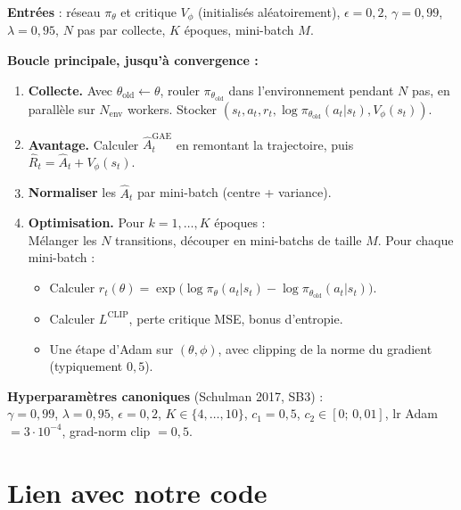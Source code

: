\documentclass[a4paper,11pt]{article}
\theoremstyle{clean}
\newcommand{\piT}{\pi_{\theta}}
\newcommand{\piOld}{\pi_{\theta_{\text{old}}}}
\begin{document}
\begin{tcolorbox}[colback=gray!5, colframe=black!50, boxrule=0.4pt, arc=1.5pt, left=8pt, right=8pt]
\textbf{Entrées} : réseau $\piT$ et critique $V_\phi$ (initialisés aléatoirement), $\epsilon=0{,}2$, $\gamma=0{,}99$, $\lambda=0{,}95$, $N$ pas par collecte, $K$ époques, mini-batch $M$.

\medskip
\textbf{Boucle principale, jusqu'à convergence :}
\begin{enumerate}[leftmargin=1.5em, nosep]
\item \textbf{Collecte.} Avec $\theta_{\text{old}} \leftarrow \theta$, rouler $\piOld$ dans l'environnement pendant $N$ pas, en parallèle sur $N_{\text{env}}$ workers. Stocker $(s_t, a_t, r_t, \log\piOld(a_t|s_t), V_\phi(s_t))$.
\item \textbf{Avantage.} Calculer $\hat A_t^{\mathrm{GAE}}$ en remontant la trajectoire, puis $\hat R_t = \hat A_t + V_\phi(s_t)$.
\item \textbf{Normaliser} les $\hat A_t$ par mini-batch (centre + variance).
\item \textbf{Optimisation.} Pour $k = 1, \dots, K$ époques :\\
Mélanger les $N$ transitions, découper en mini-batchs de taille $M$. Pour chaque mini-batch :
\begin{itemize}[nosep,leftmargin=1.2em]
\item Calculer $r_t(\theta) = \exp\!\big(\log\piT(a_t|s_t) - \log\piOld(a_t|s_t)\big)$.
\item Calculer $L^{\mathrm{CLIP}}$, perte critique MSE, bonus d'entropie.
\item Une étape d'Adam sur $(\theta, \phi)$, avec clipping de la norme du gradient (typiquement $0{,}5$).
\end{itemize}
\end{enumerate}
\end{tcolorbox}

\textbf{Hyperparamètres canoniques} (Schulman 2017, SB3) :\\
$\gamma=0{,}99$, $\lambda=0{,}95$, $\epsilon=0{,}2$, $K \in \{4, \dots, 10\}$, $c_1 = 0{,}5$, $c_2 \in [0;\, 0{,}01]$, lr Adam $= 3\cdot 10^{-4}$, grad-norm clip $= 0{,}5$.

\section{Lien avec notre code}
\end{document}
